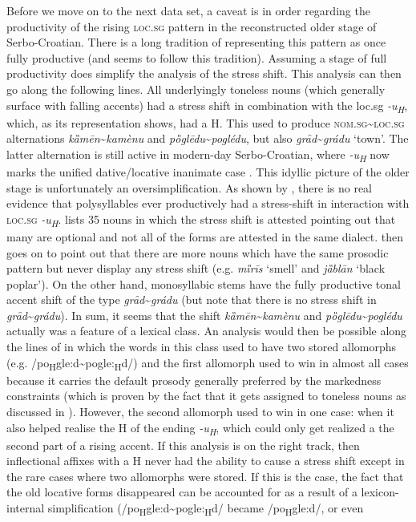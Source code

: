 \documentclass[output=paper,modfonts,nonflat
]{langsci/langscibook}
\begin{document}
Before we move on to the next data set, a caveat is in order regarding the productivity of the rising \textsc{loc}.\textsc{sg} pattern in the reconstructed older stage of Serbo-Croatian. There is a long tradition of representing this pattern as once fully productive (and \citeauthor{Klaic2013} seems to follow this tradition). Assuming a stage of full productivity does simplify the analysis of the stress shift. This analysis can then go along the following lines. All underlyingly toneless nouns (which generally surface with falling accents) had a stress shift in combination with the loc.sg \textit{-u\textsubscript{H}}, which, as its representation shows, had a H. This used to produce \textsc{nom}.\textsc{sg}\textasciitilde{}\textsc{loc}.\textsc{sg} alternations \textit{kȁmēn}\textasciitilde{}\textit{kamènu} and \textit{pȍglēdu}\textasciitilde{}\textit{poglédu}, but also \textit{grȃd}\textasciitilde{}\textit{grád}\textit{u} `town'. The latter alternation is still active in modern-day Serbo-Croatian, where \textit{-u\textsubscript{H}} now marks the unified dative/locative inanimate case \citep{SimonovicArsenijevic2015a}. This idyllic picture of the older stage is unfortunately an oversimplification. As shown by \citet[219--220]{Stevanovic1979}, there is no real evidence that polysyllables ever productively had a stress-shift in interaction with \textsc{loc}.\textsc{sg} \textit{-u\textsubscript{H}}. \citeauthor{Stevanovic1979} lists 35 nouns in which the stress shift is attested pointing out that many are optional and not all of the forms are attested in the same dialect. \citeauthor{Stevanovic1979} then goes on to point out that there are more nouns which have the same prosodic pattern but never display any stress shift (e.g. \textit{mȉrīs} `smell' and \textit{jȁblān} `black poplar’). On the other hand, monosyllabic stems have the fully productive tonal accent shift of the type \textit{grȃd}\textasciitilde{}\textit{grádu} (but note that there is no stress shift in \textit{grȃd}\textasciitilde{}\textit{grádu}). In sum, it seems that the shift \textit{kȁmēn}\textasciitilde{}\textit{kamènu} and \textit{pȍglēdu}\textasciitilde{}\textit{poglédu} actually was a feature of a lexical class. An analysis would then be possible along the lines of \citet{Kager2008} in which the words in this class used to have two stored allomorphs (e.g. /po\textsubscript{H}gle:d\textasciitilde{}pogle:\textsubscript{H}d/) and the first allomorph used to win in almost all cases because it carries the default prosody generally preferred by the markedness constraints (which is proven by the fact that it gets assigned to toneless nouns as discussed in ). However, the second allomorph used to win in one case: when it also helped realise the H of the ending \textit{-u\textsubscript{H}}, which could only get realized a the second part of a rising accent. If this analysis is on the right track, then inflectional affixes with a H never had the ability to cause a stress shift except in the rare cases where two allomorphs were stored. If this is the case, the fact that the old locative forms disappeared can be accounted for as a result of a lexicon-internal simplification (/po\textsubscript{H}gle:d\textasciitilde{}pogle:\textsubscript{H}d/ became /po\textsubscript{H}gle:d/, or even 
\end{document}
